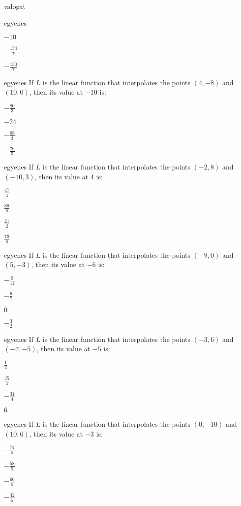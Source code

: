 \documentclass[12pt]{article}
\begin{document}
\begin{quiz}{valogat}
\begin{multi}{egyenes}
\item  $ -10 $
\item  $ -\frac{134}{7} $
\item  $ -\frac{150}{7} $
\end{multi}
\begin{multi}{egyenes}
If $L$ is the linear function that interpolates the points
$(4,-8)$ and $(10,0)$, then its value at $-10$ is:
\item* $ -\frac{80}{3} $
\item  $ -24 $
\item  $ -\frac{68}{3} $
\item  $ -\frac{76}{3} $
\end{multi}
\begin{multi}{egyenes}
If $L$ is the linear function that interpolates the points
$(-2,8)$ and $(-10,3)$, then its value at $4$ is:
\item* $ \frac{47}{4} $
\item  $ \frac{89}{8} $
\item  $ \frac{21}{2} $
\item  $ \frac{79}{8} $
\end{multi}
\begin{multi}{egyenes}
If $L$ is the linear function that interpolates the points
$(-9,0)$ and $(5,-3)$, then its value at $-6$ is:
\item* $ -\frac{9}{14} $
\item  $ -\frac{6}{7} $
\item  $ 0 $
\item  $ -\frac{3}{2} $
\end{multi}
\begin{multi}{egyenes}
If $L$ is the linear function that interpolates the points
$(-3,6)$ and $(-7,-5)$, then its value at $-5$ is:
\item* $ \frac{1}{2} $
\item  $ \frac{35}{4} $
\item  $ -\frac{31}{4} $
\item  $ 6 $
\end{multi}
\begin{multi}{egyenes}
If $L$ is the linear function that interpolates the points
$(0,-10)$ and $(10,6)$, then its value at $-3$ is:
\item* $ -\frac{74}{5} $
\item  $ -\frac{58}{5} $
\item  $ -\frac{66}{5} $
\item  $ -\frac{42}{5} $
\end{multi}

\end{quiz}
\end{document}
